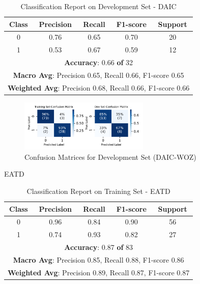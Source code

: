 \begin{table}[H]
\centering

\label{table:classification_report_dev}
\begin{tabular}{|c|c|c|c|c|}
\hline
\textbf{Class} & \textbf{Precision} & \textbf{Recall} & \textbf{F1-score} & \textbf{Support} \\ \hline
0              & 0.76               & 0.65            & 0.70              & 20               \\ \hline
1              & 0.53               & 0.67            & 0.59              & 12               \\ \hline
\multicolumn{5}{|c|}{\textbf{Accuracy}: 0.66 \textbf{of} 32}                          \\ \hline
\multicolumn{5}{|c|}{\textbf{Macro Avg}: Precision 0.65, Recall 0.66, F1-score 0.65} \\ \hline
\multicolumn{5}{|c|}{\textbf{Weighted Avg}: Precision 0.68, Recall 0.66, F1-score 0.66} \\ \hline
\end{tabular}
\caption{Classification Report on Development Set - DAIC}
\end{table}

\begin{figure}[H]
\centering
\includegraphics[width=0.55\textwidth]{vis_pdf/daic_all_confusion_matrices.pdf} %
\caption{Confusion Matrices for Development Set (DAIC-WOZ)}
\label{fig:confusion_matrices}
\end{figure}


EATD




\begin{table}[H]
\centering
\label{table:classification_report_train_eatd}
\begin{tabular}{|c|c|c|c|c|}
\hline
\textbf{Class} & \textbf{Precision} & \textbf{Recall} & \textbf{F1-score} & \textbf{Support} \\ \hline
0              & 0.96               & 0.84            & 0.90              & 56               \\ \hline
1              & 0.74               & 0.93            & 0.82              & 27               \\ \hline
\multicolumn{5}{|c|}{\textbf{Accuracy}: 0.87 \textbf{of} 83}                        \\ \hline
\multicolumn{5}{|c|}{\textbf{Macro Avg}: Precision 0.85, Recall 0.88, F1-score 0.86} \\ \hline
\multicolumn{5}{|c|}{\textbf{Weighted Avg}: Precision 0.89, Recall 0.87, F1-score 0.87} \\ \hline
\end{tabular}
\caption{Classification Report on Training Set - EATD}
\end{table}


